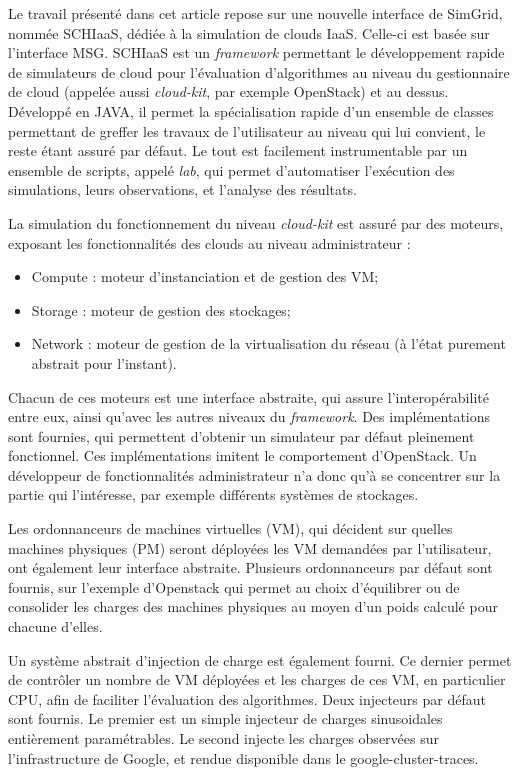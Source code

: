 \documentclass[parallelisme]{compas2017}
\begin{document}
Le  travail présenté  dans  cet article  repose sur  une  nouvelle interface  de
SimGrid, nommée  SCHIaaS, dédiée à la  simulation de clouds IaaS.   Celle-ci est
basée  sur l'interface  MSG.  SCHIaaS  est un  \textit{framework} permettant  le
développement rapide de simulateurs de  cloud pour l'évaluation d'algorithmes au
niveau du gestionnaire  de cloud (appelée aussi  \textit{cloud-kit}, par exemple
OpenStack) et au dessus.  Développé en  JAVA, il permet la spécialisation rapide
d'un ensemble de  classes permettant de greffer les travaux  de l'utilisateur au
niveau  qui  lui convient,  le  reste  étant assuré  par  défaut.   Le tout  est
facilement instrumentable  par un  ensemble de  scripts, appelé  \emph{lab}, qui
permet  d'automatiser  l'exécution  des   simulations,  leurs  observations,  et
l'analyse des résultats.

La simulation du fonctionnement du  niveau \textit{cloud-kit} est assuré par des
moteurs, exposant les fonctionnalités des clouds au niveau administrateur :
\begin{itemize}
 \item Compute : moteur d'instanciation et de gestion des VM;
 \item Storage : moteur de gestion des stockages;
 \item Network : moteur de gestion de la virtualisation du réseau (à l'état purement abstrait pour l'instant).
\end{itemize}

Chacun de ces moteurs est une interface abstraite, qui assure l'interopérabilité
entre  eux,  ainsi  qu'avec  les   autres  niveaux  du  \textit{framework}.  Des
implémentations sont fournies, qui permettent d'obtenir un simulateur par défaut
pleinement   fonctionnel.   Ces    implémentations   imitent   le   comportement
d'OpenStack. Un développeur  de fonctionnalités administrateur n'a  donc qu'à se
concentrer sur  la partie  qui l'intéresse, par  exemple différents  systèmes de
stockages.

Les ordonnanceurs de machines virtuelles (VM), qui décident sur quelles machines
physiques  (PM)  seront  déployées  les  VM  demandées  par  l'utilisateur,  ont
également  leur interface  abstraite.  Plusieurs ordonnanceurs  par défaut  sont
fournis,  sur l'exemple  d'Openstack  qui  permet au  choix  d'équilibrer ou  de
consolider les charges  des machines physiques au moyen d'un  poids calculé pour
chacune d'elles.

Un  système abstrait  d'injection de  charge  est également  fourni. Ce  dernier
permet de  contrôler un  nombre de  VM déployées et  les charges  de ces  VM, en
particulier  CPU,   afin  de  faciliter  l'évaluation   des  algorithmes.   Deux
injecteurs  par défaut  sont  fournis. Le  premier est  un  simple injecteur  de
charges sinusoidales  entièrement paramétrables.  Le second injecte  les charges
observées  sur  l'infrastructure  de  Google,   et  rendue  disponible  dans  le
google-cluster-traces.
\end{document}
